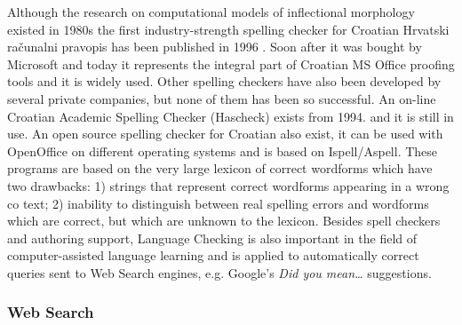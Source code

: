 \begin{multicols}{2}

Although the research on computational models of inflectional morphology existed in 1980s the first industry-strength spelling checker for Croatian Hrvatski računalni pravopis has been published in 1996 \cite{boo2}. Soon after it was bought by Microsoft and today it represents the integral part of Croatian MS Office proofing tools and it is widely used. Other spelling checkers have also been developed by several private companies, but none of them has been so successful. An on-line Croatian Academic Spelling Checker (Hascheck) \cite{str13} exists from 1994. and it is still in use. An open source spelling checker for Croatian also exist, it can be used with OpenOffice on different operating systems and is based on Ispell/Aspell. These programs are based on the very large lexicon of correct wordforms which have two drawbacks: 1) strings that represent correct wordforms appearing in a wrong co text; 2) inability to distinguish between real spelling errors and wordforms which are correct, but which are unknown to the lexicon. Besides spell checkers and authoring support, Language Checking is also important in the field of computer-assisted language learning and is applied to automatically correct queries sent to Web Search engines, e.g. Google’s \textit{Did you mean…} suggestions. 

\subsubsection{Web Search}


\end{multicols}
